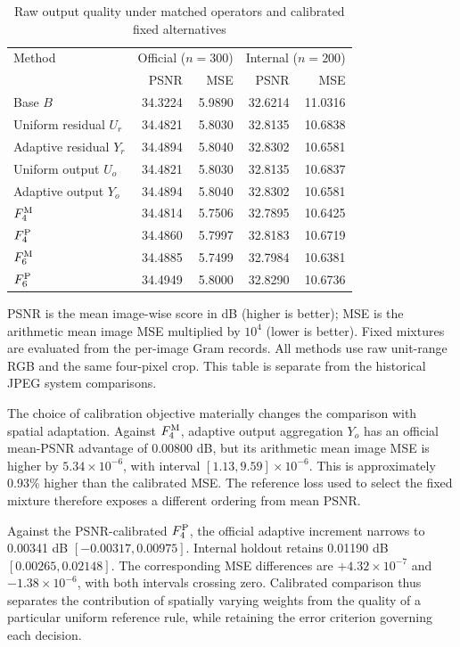 \documentclass[12pt]{article}
\newcommand{\tabnote}[1]{\par\vspace{5pt}\noindent #1}
\begin{document}
\begin{table}[t]
\caption{Raw output quality under matched operators and calibrated fixed alternatives}
\label{tab:calibrated}
\begin{tabularx}{\linewidth}{@{}Xrrrr@{}}
\toprule
Method & \multicolumn{2}{c}{Official ($n=300$)} & \multicolumn{2}{c}{Internal ($n=200$)} \\ & PSNR & MSE & PSNR & MSE\\
\midrule
Base $B$ & 34.3224 & 5.9890 & 32.6214 & 11.0316 \\
Uniform residual $U_r$ & 34.4821 & 5.8030 & 32.8135 & 10.6838 \\
Adaptive residual $Y_r$ & 34.4894 & 5.8040 & 32.8302 & 10.6581 \\
Uniform output $U_o$ & 34.4821 & 5.8030 & 32.8135 & 10.6837 \\
Adaptive output $Y_o$ & 34.4894 & 5.8040 & 32.8302 & 10.6581 \\
$F_4^{\rm M}$ & 34.4814 & 5.7506 & 32.7895 & 10.6425 \\
$F_4^{\rm P}$ & 34.4860 & 5.7997 & 32.8183 & 10.6719 \\
$F_6^{\rm M}$ & 34.4885 & 5.7499 & 32.7984 & 10.6381 \\
$F_6^{\rm P}$ & 34.4949 & 5.8000 & 32.8290 & 10.6736 \\
\bottomrule
\end{tabularx}
\tabnote{PSNR is the mean image-wise score in dB (higher is better); MSE is the arithmetic mean image MSE multiplied by $10^4$ (lower is better). Fixed mixtures are evaluated from the per-image Gram records. All methods use raw unit-range RGB and the same four-pixel crop. This table is separate from the historical JPEG system comparisons.}
\end{table}


The choice of calibration objective materially changes the comparison with spatial adaptation. Against $F_4^{\rm M}$, adaptive output aggregation $Y_o$ has an official mean-PSNR advantage of 0.00800 dB, but its arithmetic mean image MSE is higher by $5.34\times10^{-6}$, with interval $[1.13,9.59]\times10^{-6}$. This is approximately 0.93\% higher than the calibrated MSE. The reference loss used to select the fixed mixture therefore exposes a different ordering from mean PSNR.

Against the PSNR-calibrated $F_4^{\rm P}$, the official adaptive increment narrows to 0.00341 dB $[-0.00317,0.00975]$. Internal holdout retains 0.01190 dB $[0.00265,0.02148]$. The corresponding MSE differences are $+4.32\times10^{-7}$ and $-1.38\times10^{-6}$, with both intervals crossing zero. Calibrated comparison thus separates the contribution of spatially varying weights from the quality of a particular uniform reference rule, while retaining the error criterion governing each decision.
\end{document}
